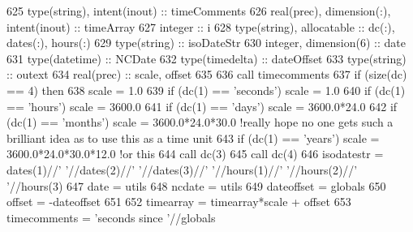 \begin{DoxyCode}
625     \textcolor{keywordtype}{type}(string), \textcolor{keywordtype}{intent(inout)} :: timeComments
626     \textcolor{keywordtype}{real(prec)}, \textcolor{keywordtype}{dimension(:)}, \textcolor{keywordtype}{intent(inout)} :: timeArray
627     \textcolor{keywordtype}{integer} :: i
628     \textcolor{keywordtype}{type}(string), \textcolor{keywordtype}{allocatable} :: dc(:), dates(:), hours(:)
629     \textcolor{keywordtype}{type}(string) :: isoDateStr
630     \textcolor{keywordtype}{integer}, \textcolor{keywordtype}{dimension(6)} :: date
631     \textcolor{keywordtype}{type}(datetime) :: NCDate
632     \textcolor{keywordtype}{type}(timedelta) :: dateOffset
633     \textcolor{keywordtype}{type}(string) :: outext
634     \textcolor{keywordtype}{real(prec)} :: scale, offset
635 
636     \textcolor{keyword}{call }timecomments%
637     \textcolor{keywordflow}{if} (\textcolor{keyword}{size}(dc) == 4) \textcolor{keywordflow}{then}
638         scale = 1.0
639         \textcolor{keywordflow}{if} (dc(1) == \textcolor{stringliteral}{'seconds'}) scale = 1.0
640         \textcolor{keywordflow}{if} (dc(1) == \textcolor{stringliteral}{'hours'})   scale = 3600.0
641         \textcolor{keywordflow}{if} (dc(1) == \textcolor{stringliteral}{'days'})    scale = 3600.0*24.0
642         \textcolor{keywordflow}{if} (dc(1) == \textcolor{stringliteral}{'months'})  scale = 3600.0*24.0*30.0 \textcolor{comment}{!really hope no one gets such a brilliant idea as
       to use this as a time unit}
643         \textcolor{keywordflow}{if} (dc(1) == \textcolor{stringliteral}{'years'})   scale = 3600.0*24.0*30.0*12.0 \textcolor{comment}{!or this}
644         \textcolor{keyword}{call }dc(3)%
645         \textcolor{keyword}{call }dc(4)%
646         isodatestr = dates(1)//\textcolor{stringliteral}{' '}//dates(2)//\textcolor{stringliteral}{' '}//dates(3)//\textcolor{stringliteral}{' '}//hours(1)//\textcolor{stringliteral}{' '}//hours(2)//\textcolor{stringliteral}{' '}//hours(3)
647         date = utils%
648         ncdate = utils%
649         dateoffset = globals%
650         offset = -dateoffset%
651 
652         timearray = timearray*scale + offset
653         timecomments = \textcolor{stringliteral}{'seconds since '}//globals%

\end{DoxyCode}
